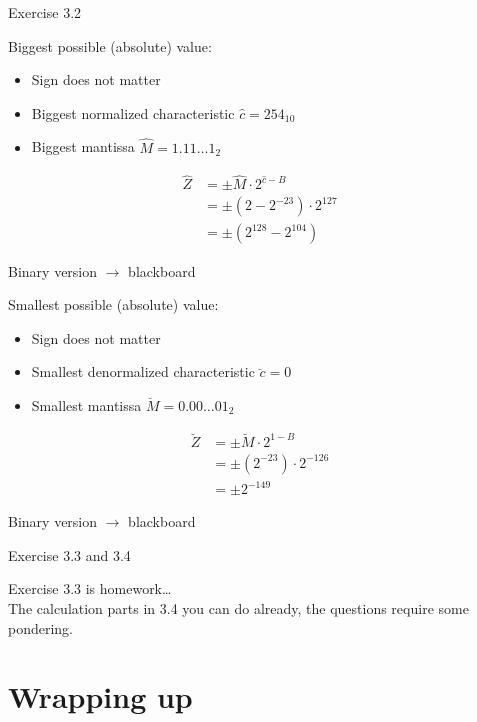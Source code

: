 \documentclass[11pt]{tudbeamer}
\begin{document}
\begin{frame}[allowframebreaks]{Exercise 3.2}

	Biggest possible (absolute) value:
	
	\begin{itemize}
		\item Sign does not matter
		\item Biggest normalized characteristic $\hat{c}=254_{10}$
		\item Biggest mantissa $\hat{M} = 1.11\dots1_2$ 
	\end{itemize}
	
	\begin{align}
	\hat{Z}	&= \pm\hat{M} 					\cdot 2^{\hat{c}-B} \\
			&= \pm\left( 2 - 2^{-23}\right) 	\cdot 2^{127} \\
			&= \pm\left(2^{128} - 2^{104}\right)
	\end{align}

	Binary version $\rightarrow$ blackboard
	
\framebreak

	Smallest possible (absolute) value:
	
	\begin{itemize}
		\item Sign does not matter
		\item Smallest denormalized characteristic $\breve{c}=0$
		\item Smallest mantissa $\breve{M} = 0.00\dots01_2$ 
	\end{itemize}
	
	\begin{align}
	\breve{Z}	&= \pm\breve{M} 				\cdot 2^{1-B} \\
				&= \pm\left(2^{-23}\right) 	\cdot 2^{-126} \\
				&= \pm 2^{-149}
	\end{align}

	Binary version $\rightarrow$ blackboard

\end{frame}

\begin{frame}{Exercise 3.3 and 3.4}

	Exercise 3.3 is homework\dots \\
	The calculation parts in 3.4 you can do already, the questions require some pondering.

\end{frame}

\section{Wrapping up}
\end{document}
